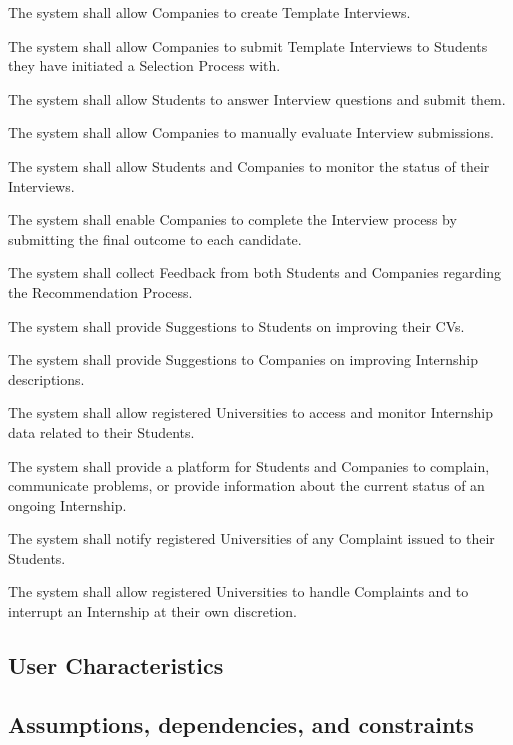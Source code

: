 \begin{enumerate}[label={\color{titleColor}[R\arabic*]}]
    \item The system shall allow Companies to create Template Interviews.
    \item The system shall allow Companies to submit Template Interviews to Students they have initiated a Selection Process with.
    \item The system shall allow Students to answer Interview questions and submit them.
    \item The system shall allow Companies to manually evaluate Interview submissions.
    \item The system shall allow Students and Companies to monitor the status of their Interviews.
    \item The system shall enable Companies to complete the Interview process by submitting the final outcome to each candidate.
    
    \item The system shall collect Feedback from both Students and Companies regarding the Recommendation Process.
    \item The system shall provide Suggestions to Students on improving their CVs.
    \item The system shall provide Suggestions to Companies on improving Internship descriptions.
    
    \item The system shall allow registered Universities to access and monitor Internship data related to their Students.
    \item The system shall provide a platform for Students and Companies to complain, communicate problems, or provide information about the current status of an ongoing Internship.
    \item The system shall notify registered Universities of any Complaint issued to their Students.
    \item The system shall allow registered Universities to handle Complaints and to interrupt an Internship at their own discretion.
\end{enumerate}


\subsection{User Characteristics}


\subsection{Assumptions, dependencies, and constraints}

